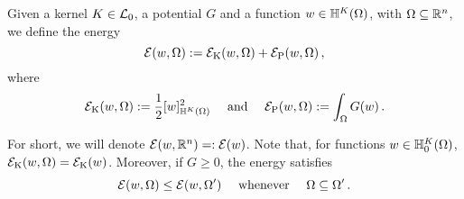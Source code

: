 \begin{definition}
\label{Def:Energy}
Given a kernel $K \in \mathcal{L}_0$, a potential $G$ and a function $w\in \mathbb{H}^K(\Omega)$, with $\Omega\subseteq \mathbb{R}^{n}$, we define the energy
$$
\mathcal{E}(w, \Omega) := \mathcal{E}_\mathrm{K}(w,\Omega) + \mathcal{E}_\mathrm{P}(w,\Omega)\,,
$$
where
$$
\mathcal{E}_\mathrm{K}(w, \Omega) := \dfrac{1}{2} [w]^2_{\mathbb{H}^K(\Omega)} \quad \text{ and } \quad  \mathcal{E}_\mathrm{P}(w, \Omega) := \int_{\Omega} G(w)
\,.
$$
\end{definition}
For short, we will denote $\mathcal{E}(w, \mathbb{R}^n) =: \mathcal{E}(w)$. Note that, for functions $w\in \mathbb{H}^K_0(\Omega)$, $\mathcal{E}_\mathrm{K}(w,\Omega) = \mathcal{E}_\mathrm{K}(w)$. Moreover, if $G\geq 0$, the energy satisfies
$$
\mathcal{E}(w, \Omega) \leq \mathcal{E}(w, \Omega') \quad \text{ whenever } \quad \Omega \subseteq \Omega'\,.
$$





